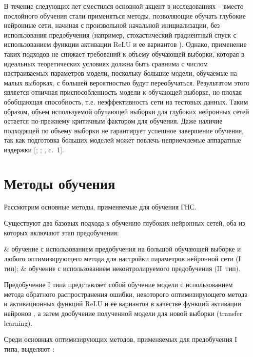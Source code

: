 В течение следующих лет сместился основной акцент в исследованиях -- вместо послойного обучения стали применяться методы, позволяющие обучать глубокие нейронные сети, начиная с произвольной начальной инициализации, без использования предобучения (например, стохастический градиентный спуск с использованием функции активации ReLU и ее вариантов \cite[c.~318]{glorot2011}). Однако, применение таких подходов не снижает требований к объему обучающей выборки, которая в идеальных теоретических условиях должна быть сравнима с числом настраиваемых параметров модели, поскольку большие модели, обучаемые на малых выборках, с большей вероятностью будут переобучаться. Результатом этого является отличная приспособленность модели к обучающей выборке, но плохая обобщающая способность, т.е. неэффективность сети на тестовых данных. Таким образом, объем используемой обучающей выборки для глубоких нейронных сетей остается по-прежнему критичным фактором для обучения. Даже наличие подходящей по объему выборки не гарантирует успешное завершение обучения, так как подготовка больших моделей может повлечь неприемлемые аппаратные издержки [; ; , c.~1].

\section{Методы обучения}

Рассмотрим основные методы, применяемые для обучения ГНС.

Существуют два базовых подхода к обучению глубоких нейронных сетей, оба из которых включают этап предобучения:

\begin{easylistNum}    
    & обучение с использованием предобучения на большой обучающей выборке и любого оптимизирующего метода для настройки параметров нейронной сети (I тип);
	& обучение с использованием неконтролируемого предобучения (II~тип).
\end{easylistNum}

Предобучение I типа представляет собой обучение модели с использованием метода обратного распространения ошибки, некоторого оптимизирующего метода и активационных функций ReLU и ее вариантов в качестве функций активации нейронов \cite[c.~436-438]{LeCun2015}, а затем дообучение полученной модели для новой выборки (transfer learning). 

Среди основных оптимизирующих методов, применяемых для предобучения I типа, выделяют \cite[c.~263-266]{Goodfellow2017}:

